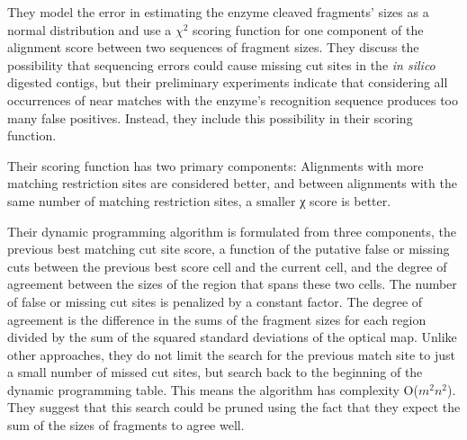 They model the error in estimating the enzyme cleaved fragments' sizes as a normal distribution and use a $\chi^2$ scoring function for one component of the alignment score between two sequences of fragment sizes.
They discuss the possibility that sequencing errors could cause missing cut sites in the \emph{in silico} digested contigs, but their preliminary experiments indicate that considering all occurrences of near matches with the enzyme’s recognition sequence produces too many false positives.
Instead, they include this possibility in their scoring function.

Their scoring function has two primary components: Alignments with more matching restriction sites are considered better, and between alignments with the same number of matching restriction sites, a smaller χ score is better.

Their dynamic programming algorithm is formulated from three components, the previous best matching cut site score, a function of the putative false or missing cuts between the previous best score cell and the current cell, and the degree of agreement between the sizes of the region that spans these two cells.
The number of false or missing cut sites is penalized by a constant factor.
The degree of agreement is the difference in the sums of the fragment sizes for each region divided by the sum of the squared standard deviations of the optical map.
Unlike other approaches, they do not limit the search for the previous match site to just a small number of missed cut sites, but search back to the beginning of the dynamic programming table.
This means the algorithm has complexity O($m^2n^2$).
They suggest that this search could be pruned using the fact that they expect the sum of the sizes of fragments to agree well.

